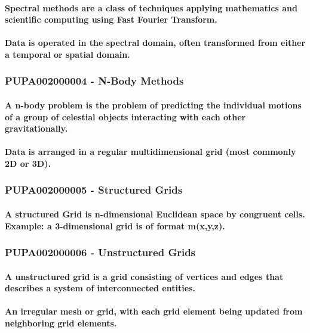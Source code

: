 \documentclass{acm_proc_article-sp}
\begin{document}
\paragraph{Spectral methods are a class of techniques applying mathematics and scientific computing using Fast Fourier Transform.}
\paragraph{Data is operated in the spectral domain, often transformed from either a temporal or spatial domain.}
\subsubsection{PUPA002000004 - N-Body Methods}
\paragraph{A n-body problem is the problem of predicting the individual motions of a group of celestial objects interacting with each other gravitationally.}
\paragraph{Data is arranged in a regular multidimensional grid (most commonly 2D or 3D).}
\subsubsection{PUPA002000005 - Structured Grids}
\paragraph{A structured Grid is n-dimensional Euclidean space by congruent cells. Example: a 3-dimensional grid is of format m(x,y,z).}
\subsubsection{PUPA002000006 - Unstructured Grids}
\paragraph{A unstructured grid is a grid consisting of vertices and edges that describes a system of interconnected entities.}
\paragraph{An irregular mesh or grid, with each grid element being updated from neighboring grid elements.}
\end{document}

